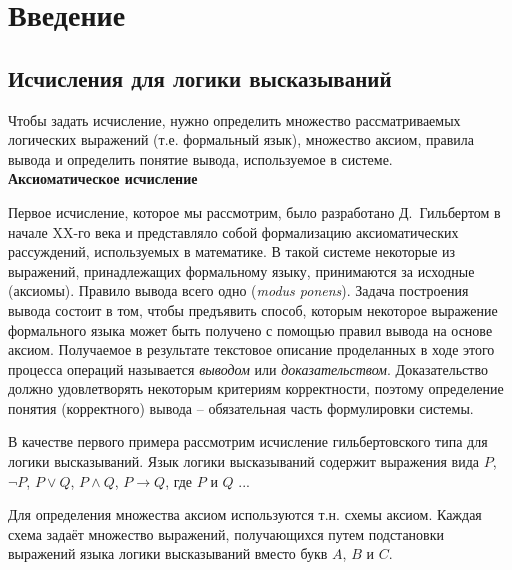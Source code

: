 \chapter{Введение}


\section{Исчисления для логики высказываний}

Чтобы задать исчисление, нужно определить множество рассматриваемых логических выражений (т.е. формальный язык), множество аксиом, правила вывода и определить понятие вывода, используемое в системе.\\ 

\textbf{Аксиоматическое исчисление}

Первое исчисление, которое мы рассмотрим, было разработано Д.~Гильбертом в начале XX-го века и представляло собой формализацию аксиоматических рассуждений, используемых в математике. В такой системе некоторые из выражений, принадлежащих формальному языку, принимаются за исходные (аксиомы). Правило вывода всего одно (\textit{modus ponens}). Задача построения вывода состоит в том, чтобы предъявить способ, которым некоторое выражение формального языка может быть получено с помощью правил вывода на основе аксиом. Получаемое в результате текстовое описание проделанных в ходе этого процесса операций называется \textit{выводом} или \textit{доказательством}. Доказательство должно удовлетворять некоторым критериям корректности, поэтому определение понятия (корректного) вывода -- обязательная часть формулировки системы. 

В качестве первого примера рассмотрим исчисление гильбертовского типа для логики высказываний. Язык логики высказываний содержит выражения вида $P$, $\neg P$, $P \vee Q$, $P \wedge Q$, $P \to Q$, где $P$ и $Q$ ...

Для определения множества аксиом используются т.н. схемы аксиом. Каждая схема задаёт множество выражений, получающихся путем подстановки выражений языка логики высказываний вместо букв $A$, $B$ и $C$.

